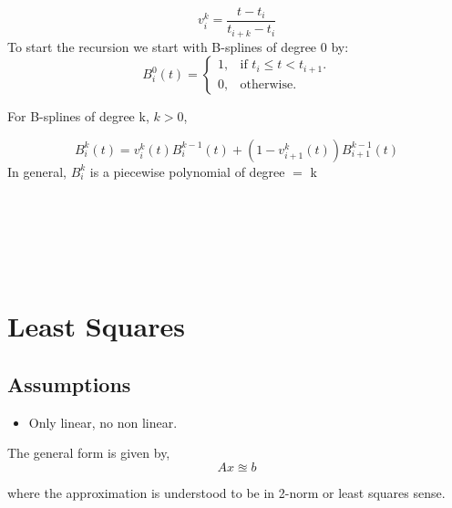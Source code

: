\documentclass[12pt]{article}
\begin{document}
\begin{equation*}
v_i ^k = \frac{t-t_i}{t_{i+k} - t_i}
\end{equation*}
To start the recursion we start with B-splines of degree 0 by:
\begin{equation*}
B_i ^0 (t) = \begin{cases}
1, & \text{if $t_i \leq t < t_{i+1}$}.\\
0, & \text{otherwise}.
\end{cases}
\end{equation*}

For B-splines of degree k, $k > 0$,

\begin{equation*}
B_i ^k (t) = v_i ^k (t) B_i ^{k-1} (t) + (1 - v_{i+1} ^k (t))B_{i+1} ^{k-1} (t)
\end{equation*}
In general, $B_i ^k$ is a piecewise polynomial of degree $=$ k 







\ms{***********************************************************************}
~\newline

\ms{***********************************************************************}
~\newline


\ms{***********************************************************************}
~\newline
{}
\section{Least Squares}
\subsection{Assumptions}
\begin{itemize}
	\item Only linear, no non linear.
\end{itemize}
The general form is given by,
\begin{equation*}
Ax \approxeq b
\end{equation*}

where the approximation is understood to be in 2-norm or least squares sense.
\end{document}

